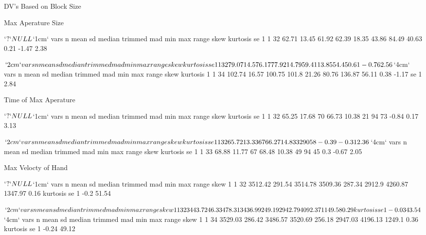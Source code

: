 \documentclass{article}
\begin{document}
\newpage

\normalsize
\bf
\centerline{DV's Based on Block Size}
\small
Max Aperature Size
\begin{Schunk}
\begin{Soutput}
$`?`
NULL

$`1cm`
  vars  n  mean    sd median trimmed   mad   min   max range skew kurtosis   se
1    1 32 62.71 13.45  61.92   62.39 18.35 43.86 84.49 40.63 0.21    -1.47 2.38

$`2cm`
  vars  n  mean   sd median trimmed   mad  min    max range skew kurtosis   se
1    1 32 79.07 14.5  76.17   77.92 14.79 59.4 113.85 54.45 0.61    -0.76 2.56

$`4cm`
  vars  n   mean    sd median trimmed   mad   min    max range skew kurtosis
1    1 34 102.74 16.57 100.75   101.8 21.26 80.76 136.87 56.11 0.38    -1.17
    se
1 2.84
\end{Soutput}
\end{Schunk}

Time of Max Aperature
\begin{Schunk}
\begin{Soutput}
$`?`
NULL

$`1cm`
  vars  n  mean    sd median trimmed   mad min max range  skew kurtosis   se
1    1 32 65.25 17.68     70   66.73 10.38  21  94    73 -0.84     0.17 3.13

$`2cm`
  vars  n  mean    sd median trimmed   mad min max range  skew kurtosis   se
1    1 32 65.72 13.33     67   66.27 14.83  32  90    58 -0.39    -0.31 2.36

$`4cm`
  vars  n  mean    sd median trimmed   mad min max range skew kurtosis   se
1    1 33 68.88 11.77     67   68.48 10.38  49  94    45  0.3    -0.67 2.05
\end{Soutput}
\end{Schunk}

Max Velocty of Hand
\begin{Schunk}
\begin{Soutput}
$`?`
NULL

$`1cm`
  vars  n    mean     sd  median trimmed    mad    min     max   range skew
1    1 32 3512.42 291.54 3514.78 3509.36 287.34 2912.9 4260.87 1347.97 0.16
  kurtosis    se
1     -0.2 51.54

$`2cm`
  vars  n   mean    sd  median trimmed    mad     min     max   range skew
1    1 32 3443.7 246.3 3478.31 3436.99 249.19 2942.79 4092.37 1149.58 0.29
  kurtosis    se
1    -0.03 43.54

$`4cm`
  vars  n    mean     sd  median trimmed    mad     min     max  range skew
1    1 34 3529.03 286.42 3486.57 3520.69 256.18 2947.03 4196.13 1249.1 0.36
  kurtosis    se
1    -0.24 49.12
\end{Soutput}
\end{Schunk}
\end{document}

